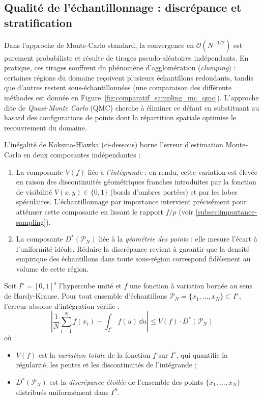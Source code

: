 \subsection{Qualité de l'échantillonnage : discrépance et stratification}

Dans l'approche de Monte-Carlo standard, la convergence en $\mathcal{O}(N^{-1/2})$ est purement probabiliste et résulte de tirages pseudo-aléatoires indépendants. En pratique, ces tirages souffrent du phénomène d'agglomération (\emph{clumping}) : certaines régions du domaine reçoivent plusieurs échantillons redondants, tandis que d'autres restent sous-échantillonnées (une comparaison des différente méthodes est donnée en Figure~\ref{fig:comparatif_sampling_mc_qmc}). L'approche dite de \emph{Quasi-Monte Carlo} (QMC) cherche à éliminer ce défaut en substituant au hasard des configurations de points dont la répartition spatiale optimise le recouvrement du domaine.

L'inégalité de Koksma-Hlawka (ci-dessous) borne l'erreur d'estimation Monte-Carlo en deux composantes indépendantes : 
\begin{enumerate}
    \item La composante $V(f)$ liée à \emph{l'intégrande} : en rendu, cette variation est élevée en raison des discontinuités géométriques franches introduites par la fonction de visibilité $V(x, y) \in \{0, 1\}$ (bords d'ombres portées) et par les lobes spéculaires. L'échantillonnage par importance intervient précisément pour atténuer cette composante en lissant le rapport $f/p$ (voir \ref{subsec:importance-sampling}).
    \item La composante $D^*(\mathcal{P}_N)$ liée à la \emph{géométrie des points} : elle mesure l'écart à l'uniformité idéale. Réduire la discrépance revient à garantir que la densité empirique des échantillons dans toute sous-région correspond fidèlement au volume de cette région.
\end{enumerate}

\begin{theorem}
    Soit $I^s = [0, 1]^s$ l'hypercube unité et $f$ une fonction à variation bornée au sens de Hardy-Krause. Pour tout ensemble d'échantillons $\mathcal{P}_N = \{x_1, \dots, x_N\} \subset I^s$, l'erreur absolue d'intégration vérifie :
    \begin{equation}
        \left| \frac{1}{N} \sum_{i=1}^N f(x_i) - \int_{I^s} f(u) \, \dd u \right| \leqslant V(f) \cdot D^*(\mathcal{P}_N)
    \end{equation}
    où :
    \begin{itemize}
        \item $V(f)$ est la \emph{variation totale} de la fonction $f$ sur $I^s$, qui quantifie la régularité, les pentes et les discontinuités de l'intégrande ;
        \item $D^*(\mathcal{P}_N)$ est la \emph{discrépance étoilée} de l'ensemble des points $\{x_1, \dots, x_N\}$ distribués uniformément dans $I^S$. 
    \end{itemize}
\end{theorem}


